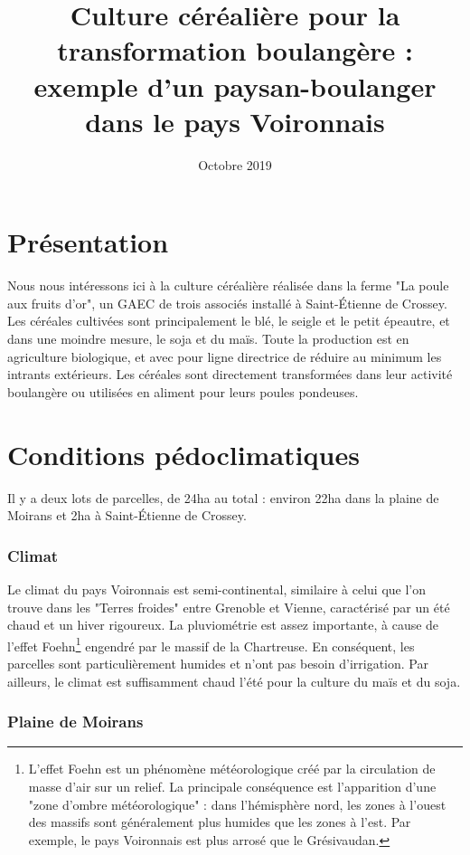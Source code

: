 \documentclass{article}
\title{Culture céréalière pour la transformation boulangère : exemple d'un paysan-boulanger dans le pays Voironnais}
\date{Octobre 2019}
\begin{document}
\maketitle

\section*{Présentation}

Nous nous intéressons ici à la culture céréalière réalisée dans la ferme "La poule aux fruits d'or", un GAEC de trois associés installé à Saint-Étienne de Crossey. Les céréales cultivées sont principalement le blé, le seigle et le petit épeautre, et dans une moindre mesure, le soja et du maïs. Toute la production est en agriculture biologique, et avec pour ligne directrice de réduire au minimum les intrants extérieurs. Les céréales sont directement transformées dans leur activité boulangère ou utilisées en aliment pour leurs poules pondeuses.

\section{Conditions pédoclimatiques}

Il y a deux lots de parcelles, de 24ha au total : environ 22ha dans la plaine de Moirans et 2ha à Saint-Étienne de Crossey. 

\subsubsection*{Climat}

Le climat du pays Voironnais est semi-continental, similaire à celui que l'on trouve dans les "Terres froides" entre Grenoble et Vienne, caractérisé par un été chaud et un hiver rigoureux. La pluviométrie est assez importante, à cause de l'effet Foehn\footnote{L'effet Foehn est un phénomène météorologique créé par la circulation de masse d'air sur un relief. La principale conséquence est l'apparition d'une "zone d'ombre météorologique" : dans l'hémisphère nord, les zones à l'ouest des massifs sont généralement plus humides que les zones à l'est. Par exemple, le pays Voironnais est plus arrosé que le Grésivaudan.} engendré par le massif de la Chartreuse. En conséquent, les parcelles sont particulièrement humides et n'ont pas besoin d'irrigation. Par ailleurs, le climat est suffisamment chaud l'été pour la culture du maïs et du soja.

\subsubsection*{Plaine de Moirans}
\end{document}
